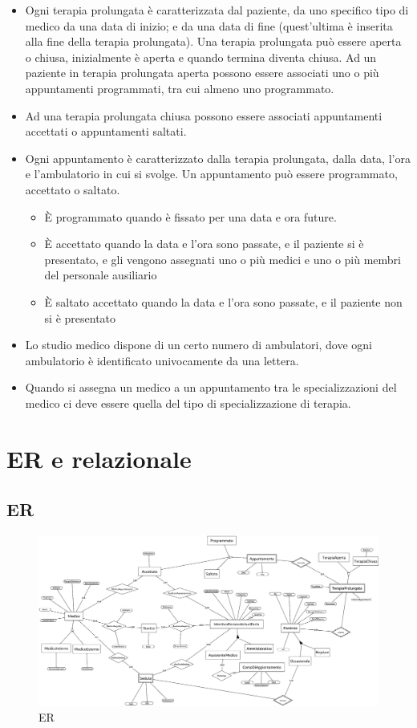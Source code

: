 \documentclass[11pt,a4paper]{article}
\begin{document}
\begin{itemize}
    \item Ogni terapia prolungata è caratterizzata dal paziente, da uno specifico tipo di medico da una data di inizio; e da una data di fine (quest’ultima è inserita alla fine della terapia prolungata). Una terapia prolungata può essere aperta o chiusa, inizialmente è aperta e quando termina diventa chiusa. Ad un paziente in terapia prolungata aperta possono essere associati uno o più appuntamenti programmati, tra cui almeno uno programmato.
    \item Ad una terapia prolungata chiusa possono essere associati appuntamenti accettati o appuntamenti saltati.
    \item Ogni appuntamento è caratterizzato dalla terapia prolungata, dalla data, l’ora e l’ambulatorio in cui si svolge. Un appuntamento può essere programmato, accettato o saltato.
    \begin{itemize}
        \item È programmato quando è fissato per una data e ora future.
        \item È accettato quando la data e l’ora sono passate, e il paziente si è presentato, e gli vengono assegnati uno o più medici e uno o più membri del personale ausiliario
        \item È saltato accettato quando la data e l’ora sono passate, e il paziente non si è presentato
    \end{itemize} 
    \item Lo studio medico dispone di un certo numero di ambulatori, dove ogni ambulatorio è identificato univocamente da una lettera.
    \item Quando si assegna un medico a un appuntamento tra le specializzazioni del medico ci deve essere quella del tipo di specializzazione di terapia.

\end{itemize}

\section{ER e relazionale}

\subsection{ER}
\begin{figure}[H]
    \includegraphics[width=\linewidth]{images/ER1.png}
    \caption{ER}
    \label{fig:ER}
\end{figure}
\end{document}
